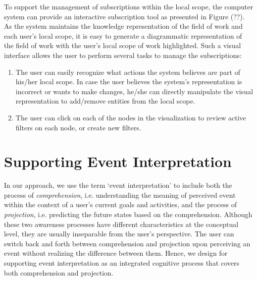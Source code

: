 To support the management of subscriptions within the local scope, the computer system can provide an interactive subscription tool as presented in Figure (??). As the system maintains the knowledge representation of the field of work and each user's local scope, it is easy to generate a diagrammatic representation of the field of work with the user's local scope of work highlighted. Such a visual interface allows the user to perform several tasks to manage the subscriptions:

\begin{enumerate}
	\item The user can easily recognize what actions the system believes are part of his/her local scope. In case the user believes the system's representation is incorrect or wants to make changes, he/she can directly manipulate the visual representation to add/remove entities from the local scope.
	\item The user can click on each of the nodes in the visualization to review active filters on each node, or create new filters. 
\end{enumerate}




\section{Supporting Event Interpretation} %
\label{sec:supporting_event_interpretation}
In our approach, we use the term `event interpretation' to include both the process of \emph{comprehension}, i.e. understanding the meaning of perceived event within the context of a user's current goals and activities, and the process of \emph{projection}, i.e. predicting the future states based on the comprehension. Although these two awareness processes have different characteristics at the conceptual level, they are usually inseparable from the user's perspective. The user can switch back and forth between comprehension and projection upon perceiving an event without realizing the difference between them. Hence, we design for supporting event interpretation as an integrated cognitive process that covers both comprehension and projection.

